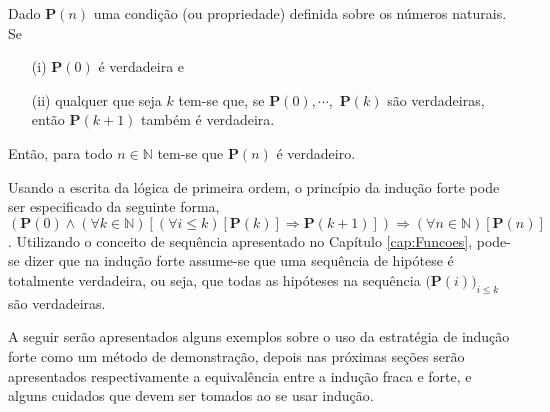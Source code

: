 \begin{definicao}\label{def:InducaoForte}
	Dado \textbf{P}$(n)$ uma condição (ou propriedade) definida sobre os números naturais. Se
	\begin{itemize}
		\item[(i)] \textbf{P}$(0)$ é verdadeira e
		\item[(ii)] qualquer que seja $k$ tem-se que, se  \textbf{P}$(0), \cdots,$ \textbf{P}$(k)$ são verdadeiras, então \textbf{P}$(k + 1)$ também é verdadeira. 
	\end{itemize}
	Então, para todo $n \in \mathbb{N}$  tem-se que $\textbf{P}(n)$ é verdadeiro.
\end{definicao}

Usando a escrita da lógica de primeira ordem, o princípio da indução forte pode ser especificado da seguinte forma, $(\textbf{P}(0) \land (\forall k \in \mathbb{N})[(\forall i \leq k)[\textbf{P}(k)] \Rightarrow \textbf{P}(k+1)]) \Rightarrow (\forall n \in \mathbb{N})[\textbf{P}(n)]$. Utilizando o conceito de sequência apresentado no Capítulo \ref{cap:Funcoes}, pode-se dizer que na indução forte assume-se que uma sequência  de hipótese é totalmente verdadeira, ou seja, que todas as hipóteses na sequência $($\textbf{P}$(i))_{i \leq k}$ são verdadeiras. 

A seguir serão apresentados alguns exemplos sobre o uso da estratégia de indução forte como um método de demonstração, depois nas próximas seções serão apresentados respectivamente a equivalência entre a indução fraca e forte, e alguns cuidados que devem ser tomados ao se usar indução.

